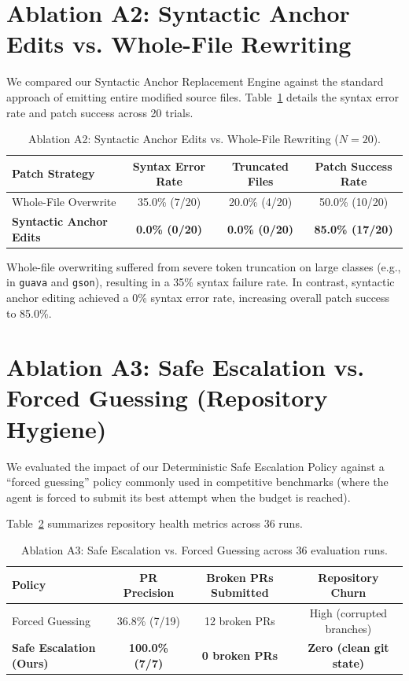 \documentclass[12pt,a4paper]{report}
\begin{document}
\section{Ablation A2: Syntactic Anchor Edits vs. Whole-File Rewriting}
We compared our Syntactic Anchor Replacement Engine against the standard approach of emitting entire modified source files. Table~\ref{tab:ablation_a2} details the syntax error rate and patch success across 20 trials.

\begin{table}[htbp]
\centering
\caption{Ablation A2: Syntactic Anchor Edits vs. Whole-File Rewriting ($N = 20$).}
\label{tab:ablation_a2}
\begin{tabular}{l c c c}
\toprule
\textbf{Patch Strategy} & \textbf{Syntax Error Rate} & \textbf{Truncated Files} & \textbf{Patch Success Rate} \\
\midrule
Whole-File Overwrite & 35.0\% (7/20) & 20.0\% (4/20) & 50.0\% (10/20) \\
\textbf{Syntactic Anchor Edits} & \textbf{0.0\% (0/20)} & \textbf{0.0\% (0/20)} & \textbf{85.0\% (17/20)} \\
\bottomrule
\end{tabular}
\end{table}

Whole-file overwriting suffered from severe token truncation on large classes (e.g., in \texttt{guava} and \texttt{gson}), resulting in a 35\% syntax failure rate. In contrast, syntactic anchor editing achieved a 0\% syntax error rate, increasing overall patch success to 85.0\%.

\section{Ablation A3: Safe Escalation vs. Forced Guessing (Repository Hygiene)}
We evaluated the impact of our Deterministic Safe Escalation Policy against a ``forced guessing'' policy commonly used in competitive benchmarks (where the agent is forced to submit its best attempt when the budget is reached).

Table~\ref{tab:ablation_a3} summarizes repository health metrics across 36 runs.

\begin{table}[htbp]
\centering
\caption{Ablation A3: Safe Escalation vs. Forced Guessing across 36 evaluation runs.}
\label{tab:ablation_a3}
\begin{tabular}{l c c c}
\toprule
\textbf{Policy} & \textbf{PR Precision} & \textbf{Broken PRs Submitted} & \textbf{Repository Churn} \\
\midrule
Forced Guessing & 36.8\% (7/19) & 12 broken PRs & High (corrupted branches) \\
\textbf{Safe Escalation (Ours)} & \textbf{100.0\% (7/7)} & \textbf{0 broken PRs} & \textbf{Zero (clean git state)} \\
\bottomrule
\end{tabular}
\end{table}
\end{document}
